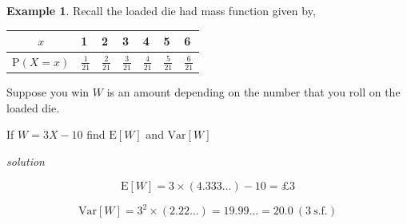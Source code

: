 \documentclass[
]{book}
\theoremstyle{definition}
\theoremstyle{definition}
\newtheorem{example}{Example}[chapter]
\theoremstyle{definition}
\theoremstyle{definition}
\theoremstyle{remark}
\begin{document}
\begin{example}
Recall the loaded die had mass function given by,

\begin{longtable}[]{@{}cllllll@{}}
\toprule
\begin{minipage}[b]{0.28\columnwidth}\centering
\(x\)\strut
\end{minipage} & \begin{minipage}[b]{0.09\columnwidth}\raggedright
1\strut
\end{minipage} & \begin{minipage}[b]{0.09\columnwidth}\raggedright
2\strut
\end{minipage} & \begin{minipage}[b]{0.09\columnwidth}\raggedright
3\strut
\end{minipage} & \begin{minipage}[b]{0.09\columnwidth}\raggedright
4\strut
\end{minipage} & \begin{minipage}[b]{0.09\columnwidth}\raggedright
5\strut
\end{minipage} & \begin{minipage}[b]{0.09\columnwidth}\raggedright
6\strut
\end{minipage}\tabularnewline
\midrule
\endhead
\begin{minipage}[t]{0.28\columnwidth}\centering
\(\text{P}(X=x)\)\strut
\end{minipage} & \begin{minipage}[t]{0.09\columnwidth}\raggedright
\(\frac{1}{21}\)\strut
\end{minipage} & \begin{minipage}[t]{0.09\columnwidth}\raggedright
\(\frac{2}{21}\)\strut
\end{minipage} & \begin{minipage}[t]{0.09\columnwidth}\raggedright
\(\frac{3}{21}\)\strut
\end{minipage} & \begin{minipage}[t]{0.09\columnwidth}\raggedright
\(\frac{4}{21}\)\strut
\end{minipage} & \begin{minipage}[t]{0.09\columnwidth}\raggedright
\(\frac{5}{21}\)\strut
\end{minipage} & \begin{minipage}[t]{0.09\columnwidth}\raggedright
\(\frac{6}{21}\)\strut
\end{minipage}\tabularnewline
\bottomrule
\end{longtable}

Suppose you win \(W\) is an amount depending on the number that you roll on the loaded die.

If \(W = 3X-10\) find \(\text{E}[W]\) and \(\text{Var}[W]\)

\emph{solution}

\[\text{E}[W] = 3\times (4.333\dots) -10 = £3\]

\[\text{Var}[W] = 3^2\times(2.22\dots) = 19.99\dots = 20.0 \  (3 \ \text{s.f.})\]
\end{example}
\end{document}
